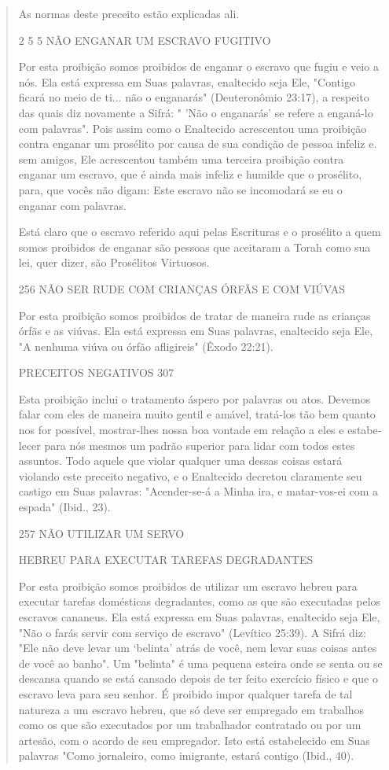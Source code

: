 \begin{quote}
As normas deste preceito estão explicadas ali.

2 5 5 NÃO ENGANAR UM ESCRAVO FUGITIVO

Por esta proibição somos proibidos de enganar o escravo que fugiu e veio
a nós. Ela está expressa em Suas palavras, enaltecido seja Ele, "Contigo
ficará no meio de ti... não o enganarás" (Deuteronômio 23:17), a
respeito das quais diz novamente a Sifrá: " 'Não o enganarás' se refere
a enganá-lo com pa­lavras". Pois assim como o Enaltecido acrescentou uma
proibição contra enga­nar um prosélito por causa de sua condição de
pessoa infeliz e. sem amigos, Ele acrescentou também uma terceira
proibição contra enganar um escravo, que é ainda mais infeliz e humilde
que o prosélito, para, que vocês não digam: Este escravo não se
incomodará se eu o enganar com palavras.

Está claro que o escravo referido aqui pelas Escrituras e o prosélito a
quem somos proibidos de enganar são pessoas que aceitaram a Torah como
sua lei, quer dizer, são Prosélitos Virtuosos.

256 NÃO SER RUDE COM CRIANÇAS ÓRFÃS E COM VIÚVAS

Por esta proibição somos proibidos de tratar de maneira rude as
crian­ças órfãs e as viúvas. Ela está expressa em Suas palavras,
enaltecido seja Ele, "A nenhuma viúva ou órfão afligireis" (Êxodo
22:21).

PRECEITOS NEGATIVOS 307

Esta proibição inclui o tratamento áspero por palavras ou atos. De­vemos
falar com eles de maneira muito gentil e amável, tratá-los tão bem
quan­to nos for possível, mostrar-lhes nossa boa vontade em relação a
eles e estabe­lecer para nós mesmos um padrão superior para lidar com
todos estes assun­tos. Todo aquele que violar qualquer uma dessas coisas
estará violando este preceito negativo, e o Enaltecido decretou
claramente seu castigo em Suas pa­lavras: "Acender-se-á a Minha ira, e
matar-vos-ei com a espada" (Ibid., 23).

257 NÃO UTILIZAR UM SERVO

HEBREU PARA EXECUTAR TAREFAS DEGRADANTES

Por esta proibição somos proibidos de utilizar um escravo hebreu para
executar tarefas domésticas degradantes, como as que são executadas
pe­los escravos cananeus. Ela está expressa em Suas palavras, enaltecido
seja Ele, "Não o farás servir com serviço de escravo" (Levítico 25:39).
A Sifrá diz: "Ele não deve levar um `belinta' atrás de você, nem levar
suas coisas antes de você ao banho". Um "belinta" é uma pequena esteira
onde se senta ou se descansa quando se está cansado depois de ter feito
exercício físico e que o escravo leva para seu senhor. É proibido impor
qualquer tarefa de tal natureza a um escravo hebreu, que só deve ser
empregado em trabalhos como os que são executados por um trabalhador
contratado ou por um artesão, com o acordo de seu em­pregador. Isto está
estabelecido em Suas palavras "Como jornaleiro, como imi­grante, estará
contigo (Ibid., 40).


\end{quote}
